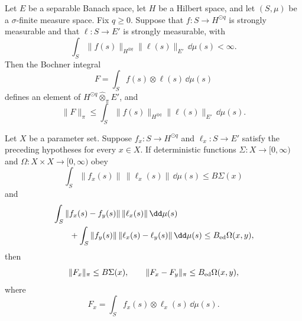 \begin{lemma}
\label{lem:spde-projective-kernel-dual-norm-estimate}
Let \(E\) be a separable Banach space, let \(H\) be a Hilbert space, and let
\((S,\mu)\) be a \(\sigma\)-finite measure space.  Fix \(q\geq0\).  Suppose
that \(f:S\to H^{\odot q}\) is strongly measurable and that
\(\ell:S\to E'\) is strongly measurable, with
\[
  \int_S \|f(s)\|_{H^{\otimes q}}\|\ell(s)\|_{E'}\,\dd\mu(s)<\infty .
\]
Then the Bochner integral
\[
  F=\int_S f(s)\otimes \ell(s)\,\dd\mu(s)
\]
defines an element of \(H^{\odot q}\widehat\otimes_\pi E'\), and
\begin{equation}
  \|F\|_\pi
  \leq
  \int_S \|f(s)\|_{H^{\otimes q}}\|\ell(s)\|_{E'}\,\dd\mu(s).
  \label{eq:spde-projective-kernel-bound}
\end{equation}

Let \(X\) be a parameter set.  Suppose \(f_x:S\to H^{\odot q}\) and
\(\ell_x:S\to E'\) satisfy the preceding hypotheses for every \(x\in X\).
If deterministic functions \(\Sigma:X\to[0,\infty)\) and
\(\Omega:X\times X\to[0,\infty)\) obey
\begin{equation}
  \int_S\|f_x(s)\|\,\|\ell_x(s)\|\,\dd\mu(s)
  \leq B\Sigma(x)
  \label{eq:spde-projective-kernel-base-hypothesis}
\end{equation}
and
\begin{equation}
\begin{aligned}
  &\int_S\|f_x(s)-f_y(s)\|\,\|\ell_x(s)\|\,\dd\mu(s)        \\
  &\qquad
  +\int_S\|f_y(s)\|\,\|\ell_x(s)-\ell_y(s)\|\,\dd\mu(s)
  \leq B_{\rm ed}\Omega(x,y),
\end{aligned}
  \label{eq:spde-projective-kernel-edge-hypothesis}
\end{equation}
then
\[
  \|F_x\|_\pi\leq B\Sigma(x),
  \qquad
  \|F_x-F_y\|_\pi\leq B_{\rm ed}\Omega(x,y),
\]
where
\[
  F_x=\int_S f_x(s)\otimes\ell_x(s)\,\dd\mu(s).
\]
\end{lemma}

